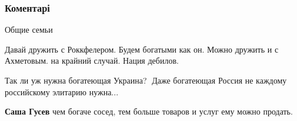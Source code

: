  
 
 
 
 
\subsubsection{Коментарі}
\label{sec:27_08_2021.fb.ljashenko_gleb.1.patrioty_amerika_rossia.cmt}

\begin{itemize}
 
Общие семьи

 
Давай дружить с Роккфелером. Будем богатыми как он. Можно дружить и с Ахметовым. на крайний случай. Нация дебилов.

 
Так ли уж нужна богатеющая Украина?🤔
Даже богатеющая Россия не каждому российскому элитарию нужна...

\begin{itemize}
 
\textbf{Саша Гусев} чем богаче сосед, тем больше товаров и услуг ему можно продать.

 

\end{itemize}
\end{itemize}
